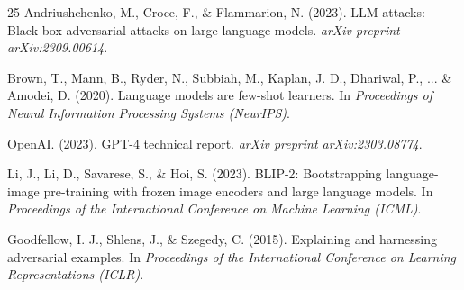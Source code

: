 \documentclass[runningheads]{llncs}
\begin{document}
\begin{thebibliography}{25}
Andriushchenko, M., Croce, F., \& Flammarion, N. (2023). LLM-attacks: Black-box adversarial attacks on large language models. \textit{arXiv preprint arXiv:2309.00614}.

Brown, T., Mann, B., Ryder, N., Subbiah, M., Kaplan, J. D., Dhariwal, P., ... \& Amodei, D. (2020). Language models are few-shot learners. In \textit{Proceedings of Neural Information Processing Systems (NeurIPS)}.

OpenAI. (2023). GPT-4 technical report. \textit{arXiv preprint arXiv:2303.08774}.

Li, J., Li, D., Savarese, S., & Hoi, S. (2023). BLIP-2: Bootstrapping language-image pre-training with frozen image encoders and large language models. In \textit{Proceedings of the International Conference on Machine Learning (ICML)}.

Goodfellow, I. J., Shlens, J., & Szegedy, C. (2015). Explaining and harnessing adversarial examples. In \textit{Proceedings of the International Conference on Learning Representations (ICLR)}.

\end{thebibliography}
\end{document}
